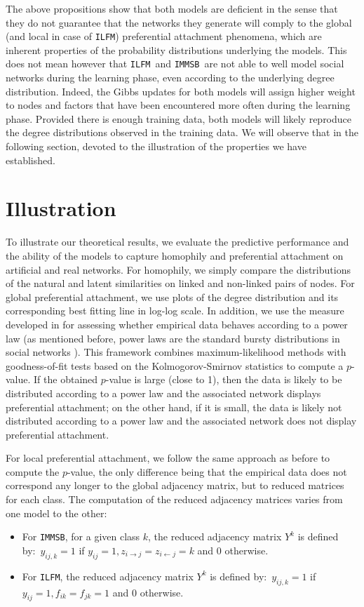\documentclass[9pt,twocolumn,twoside]{pnas-new}
\newcommand{\ifm}{\texttt{ILFM}}
\newcommand{\imb}{\texttt{IMMSB}}
\begin{document}
The above propositions show that both models are deficient in the sense that they do not guarantee that the networks they generate will comply to the global (and local in case of \ifm) preferential attachment phenomena, which are inherent properties of the probability distributions underlying the models. This does not mean however that \ifm\ and \imb\ are not able to well model social networks during the learning phase, even according to the underlying degree distribution. Indeed, the Gibbs updates for both models will assign higher weight to nodes and factors that have been encountered more often during the learning phase. Provided there is enough training data, both models will likely reproduce the degree distributions observed in the training data. We will observe that in the following section, devoted to the illustration of the properties we have established.

\section{Illustration}
\label{sec:exps}

To illustrate our theoretical results, we evaluate the predictive performance and the ability of the models to capture homophily and preferential attachment on artificial and real networks. For homophily, we simply compare the distributions of the natural and latent similarities on linked and non-linked pairs of nodes. For global preferential attachment, we use plots of the degree distribution and its corresponding best fitting line in log-log scale. In addition, we use the measure developed in \cite{clauset2009power} for assessing whether empirical data behaves according to a power law (as mentioned before, power laws are the standard bursty distributions in social networks \cite{barabasi1999emergence}). This framework combines maximum-likelihood methods with goodness-of-fit tests based on the Kolmogorov-Smirnov statistics to compute a $p$-value. If the obtained $p$-value is large (close to 1), then the data is likely to be distributed according to a power law and the associated network displays preferential attachment;  on the other hand, if it is small, the data is likely not distributed according to a power law and the associated network does not display preferential attachment.

For local preferential attachment, we follow the same approach as before to compute the $p$-value, the only difference being that the empirical data does not correspond any longer to the global adjacency matrix, but to reduced matrices for each class. The computation of the reduced adjacency matrices varies from one model to the other:
%
\begin{itemize}
    \item For \imb, for a given class $k$, the reduced adjacency matrix $Y^k$ is defined by:~$y_{ij,k}=1$ if $y_{ij}=1, z_{i\rightarrow j}=z_{i\leftarrow j}=k$ and $0$ otherwise.
        \item For \ifm, the reduced adjacency matrix $Y^k$ is defined by:~$ y_{ij,k}=1$ if $y_{ij}=1 , f_{ik}=f_{jk}=1$ and $0$ otherwise.
\end{itemize}
%
\end{document}
